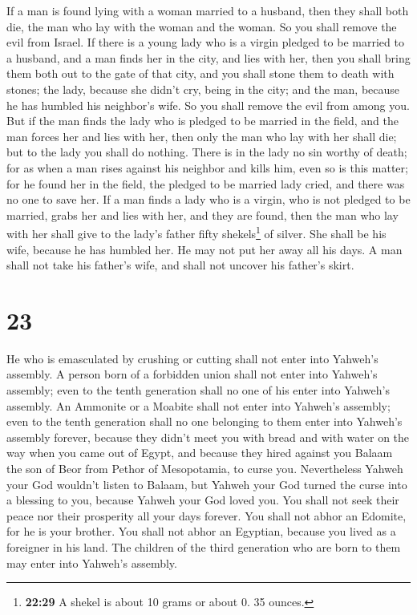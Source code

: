  If a man is found lying with a woman married to a
husband, then they shall both die, the man who lay with the woman and
the woman. So you shall remove the evil from Israel.  If
there is a young lady who is a virgin pledged to be married to a
husband, and a man finds her in the city, and lies with her,
 then you shall bring them both out to the gate of that
city, and you shall stone them to death with stones; the lady, because
she didn't cry, being in the city; and the man, because he has humbled
his neighbor's wife. So you shall remove the evil from among you.
 But if the man finds the lady who is pledged to be
married in the field, and the man forces her and lies with her, then
only the man who lay with her shall die;  but to the lady
you shall do nothing. There is in the lady no sin worthy of death; for
as when a man rises against his neighbor and kills him, even so is this
matter;  for he found her in the field, the pledged to be
married lady cried, and there was no one to save her.  If
a man finds a lady who is a virgin, who is not pledged to be married,
grabs her and lies with her, and they are found,  then
the man who lay with her shall give to the lady's father fifty
shekels\footnote{\textbf{22:29} A shekel is about 10 grams or about 0.
  35 ounces.} of silver. She shall be his wife, because he has humbled
her. He may not put her away all his days.  A man shall
not take his father's wife, and shall not uncover his father's skirt.

\hypertarget{section-22}{%
\section{23}\label{section-22}}

 He who is emasculated by crushing or cutting shall not
enter into Yahweh's assembly.  A person born of a
forbidden union shall not enter into Yahweh's assembly; even to the
tenth generation shall no one of his enter into Yahweh's assembly.
 An Ammonite or a Moabite shall not enter into Yahweh's
assembly; even to the tenth generation shall no one belonging to them
enter into Yahweh's assembly forever,  because they didn't
meet you with bread and with water on the way when you came out of
Egypt, and because they hired against you Balaam the son of Beor from
Pethor of Mesopotamia, to curse you.  Nevertheless Yahweh
your God wouldn't listen to Balaam, but Yahweh your God turned the curse
into a blessing to you, because Yahweh your God loved you.
 You shall not seek their peace nor their prosperity all
your days forever.  You shall not abhor an Edomite, for he
is your brother. You shall not abhor an Egyptian, because you lived as a
foreigner in his land.  The children of the third
generation who are born to them may enter into Yahweh's assembly.


